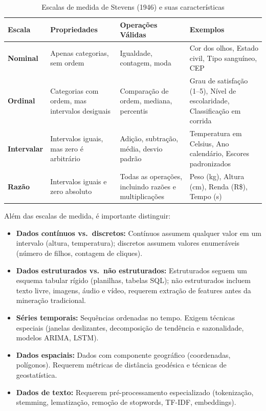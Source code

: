 \documentclass[12pt,a4paper]{article}
\begin{document}
\begin{table}[ht]
\centering
\caption{Escalas de medida de Stevens (1946) e suas características}
\label{tab:escalas}
\small
\begin{tabular}{>{\bfseries}p{2.0cm} p{3.5cm} p{3.5cm} p{4.0cm}}
\toprule
\textbf{Escala} & \textbf{Propriedades} & \textbf{Operações Válidas} & \textbf{Exemplos} \\
\midrule
Nominal & Apenas categorias, sem ordem & Igualdade, contagem, moda & Cor dos olhos, Estado civil, Tipo sanguíneo, CEP \\
\midrule
Ordinal & Categorias com ordem, mas intervalos desiguais & Comparação de ordem, mediana, percentis & Grau de satisfação (1--5), Nível de escolaridade, Classificação em corrida \\
\midrule
Intervalar & Intervalos iguais, mas zero é arbitrário & Adição, subtração, média, desvio padrão & Temperatura em Celsius, Ano calendário, Escores padronizados \\
\midrule
Razão & Intervalos iguais e zero absoluto & Todas as operações, incluindo razões e multiplicações & Peso (kg), Altura (cm), Renda (R\$), Tempo (s) \\
\bottomrule
\end{tabular}
\end{table}

Além das escalas de medida, é importante distinguir:

\begin{itemize}[leftmargin=*]
  \item \textbf{Dados contínuos vs.\ discretos:} Contínuos assumem qualquer valor em um intervalo (altura, temperatura); discretos assumem valores enumeráveis (número de filhos, contagem de cliques).

  \item \textbf{Dados estruturados vs.\ não estruturados:} Estruturados seguem um esquema tabular rígido (planilhas, tabelas SQL); não estruturados incluem texto livre, imagens, áudio e vídeo, requerem extração de features antes da mineração tradicional.

  \item \textbf{Séries temporais:} Sequências ordenadas no tempo. Exigem técnicas especiais (janelas deslizantes, decomposição de tendência e sazonalidade, modelos ARIMA, LSTM).

  \item \textbf{Dados espaciais:} Dados com componente geográfico (coordenadas, polígonos). Requerem métricas de distância geodésica e técnicas de geostatística.

  \item \textbf{Dados de texto:} Requerem pré-processamento especializado (tokenização, stemming, lematização, remoção de stopwords, TF-IDF, embeddings).
\end{itemize}
\end{document}
